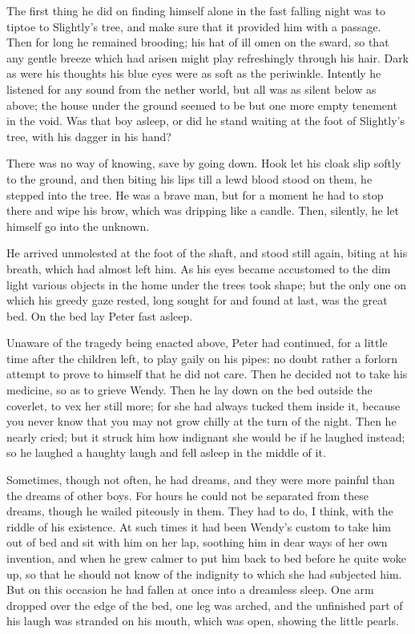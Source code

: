 The first thing he did on finding himself alone in the fast falling night
was to tiptoe to Slightly's tree, and make sure that it provided him with
a passage. Then for long he remained brooding; his hat of ill omen on the
sward, so that any gentle breeze which had arisen might play refreshingly
through his hair. Dark as were his thoughts his blue eyes were as soft as
the periwinkle. Intently he listened for any sound from the nether world,
but all was as silent below as above; the house under the ground seemed to
be but one more empty tenement in the void. Was that boy asleep, or did he
stand waiting at the foot of Slightly's tree, with his dagger in his hand?


There was no way of knowing, save by going down. Hook let his cloak slip
softly to the ground, and then biting his lips till a lewd blood stood on
them, he stepped into the tree. He was a brave man, but for a moment he
had to stop there and wipe his brow, which was dripping like a candle.
Then, silently, he let himself go into the unknown.


He arrived unmolested at the foot of the shaft, and stood still again,
biting at his breath, which had almost left him. As his eyes became
accustomed to the dim light various objects in the home under the trees
took shape; but the only one on which his greedy gaze rested, long sought
for and found at last, was the great bed. On the bed lay Peter fast
asleep.


Unaware of the tragedy being enacted above, Peter had continued, for a
little time after the children left, to play gaily on his pipes: no doubt
rather a forlorn attempt to prove to himself that he did not care. Then he
decided not to take his medicine, so as to grieve Wendy. Then he lay down
on the bed outside the coverlet, to vex her still more; for she had always
tucked them inside it, because you never know that you may not grow chilly
at the turn of the night. Then he nearly cried; but it struck him how
indignant she would be if he laughed instead; so he laughed a haughty
laugh and fell asleep in the middle of it.


Sometimes, though not often, he had dreams, and they were more painful
than the dreams of other boys. For hours he could not be separated from
these dreams, though he wailed piteously in them. They had to do, I think,
with the riddle of his existence. At such times it had been Wendy's custom
to take him out of bed and sit with him on her lap, soothing him in dear
ways of her own invention, and when he grew calmer to put him back to bed
before he quite woke up, so that he should not know of the indignity to
which she had subjected him. But on this occasion he had fallen at once
into a dreamless sleep. One arm dropped over the edge of the bed, one leg
was arched, and the unfinished part of his laugh was stranded on his
mouth, which was open, showing the little pearls.


